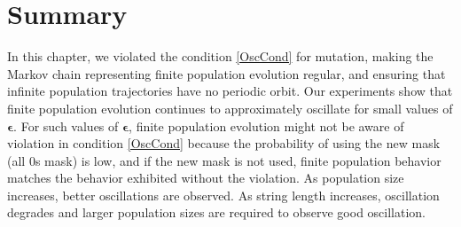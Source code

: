 \section{Summary}
In this chapter, we violated the condition \ref{OscCond} for mutation, making 
the Markov chain representing finite population evolution regular,
and ensuring that infinite population trajectories 
have no periodic orbit. Our experiments show that finite population evolution 
continues to approximately oscillate for small values of $\bm{\epsilon}$. 
For such values of $\bm{\epsilon}$, finite population evolution might not be 
aware of violation in condition \ref{OscCond} because the probability of using 
the new mask (all 0s mask) is low, and 
if the new mask is not used, finite population behavior 
matches the behavior exhibited without the violation. 
As population size increases, better oscillations are observed. 
As string length increases, oscillation degrades 
and larger population sizes are required to observe good oscillation. 




 
